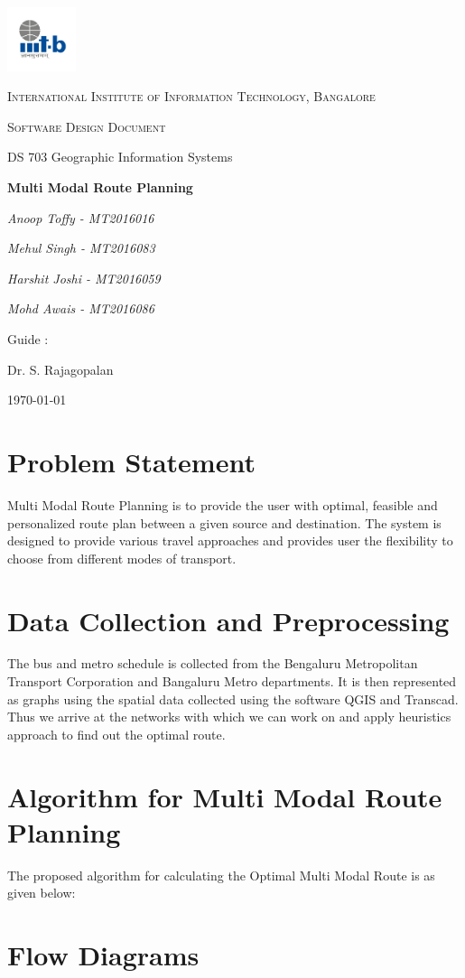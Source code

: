 \documentclass[12pt,a4paper]{article}
\begin{document}
\begin{titlepage}
	\centering
	\includegraphics[width=0.15\textwidth]{IIIT-B_logo.jpg}\par\vspace{1cm}
	{\scshape\LARGE International Institute of Information Technology, Bangalore \par}
	\vspace{1cm}
	{\scshape\Large Software Design Document\par}
	{\Large DS 703 Geographic Information Systems\par}
	\vspace{1.5cm}
	{\huge\bfseries Multi Modal Route Planning\par}
	\vspace{2cm}	   
	{\Large\itshape Anoop Toffy - MT2016016\par}
	{\Large\itshape Mehul Singh - MT2016083\par}		 
	{\Large\itshape Harshit Joshi - MT2016059\par}	 
	{\Large\itshape Mohd Awais - MT2016086\par}
	\vfill
	Guide : \par
	Dr. S. Rajagopalan

	\vfill

	{\large \today\par}
\end{titlepage}


\tableofcontents
\listoffigures
\listoftables
\newpage

\section{Problem Statement}
Multi Modal Route Planning is to provide the user with optimal, feasible and personalized route plan between a given source and destination. The system is designed to provide various travel approaches and provides user the flexibility to choose from different modes of transport.

\section{Data Collection and Preprocessing}

The bus and metro schedule is collected from the Bengaluru Metropolitan Transport Corporation and Bangaluru Metro departments. It is then represented as graphs using the spatial data collected using the software QGIS and Transcad. Thus we arrive at the networks with which we can work on and apply heuristics approach to find out the optimal route.

\section{Algorithm for Multi Modal Route Planning}

The proposed algorithm for calculating the Optimal Multi Modal Route is as given below:

\section{Flow Diagrams}
\end{document}

